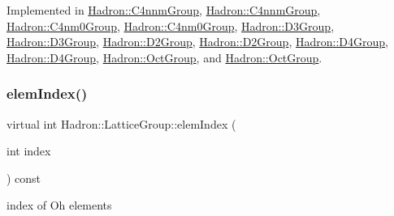 Implemented in \mbox{\hyperlink{structHadron_1_1C4nnmGroup_a8cbcb161ddf801e759797f231db35f75}{Hadron\+::\+C4nnm\+Group}}, \mbox{\hyperlink{structHadron_1_1C4nnmGroup_a8cbcb161ddf801e759797f231db35f75}{Hadron\+::\+C4nnm\+Group}}, \mbox{\hyperlink{structHadron_1_1C4nm0Group_a700a48f1865a634b774127d8710e1ecc}{Hadron\+::\+C4nm0\+Group}}, \mbox{\hyperlink{structHadron_1_1C4nm0Group_a700a48f1865a634b774127d8710e1ecc}{Hadron\+::\+C4nm0\+Group}}, \mbox{\hyperlink{structHadron_1_1D3Group_a90ac88df35dd8e919637917dc22ee903}{Hadron\+::\+D3\+Group}}, \mbox{\hyperlink{structHadron_1_1D3Group_a90ac88df35dd8e919637917dc22ee903}{Hadron\+::\+D3\+Group}}, \mbox{\hyperlink{structHadron_1_1D2Group_aa7676a51e002eb654648c4d84585d6da}{Hadron\+::\+D2\+Group}}, \mbox{\hyperlink{structHadron_1_1D2Group_aa7676a51e002eb654648c4d84585d6da}{Hadron\+::\+D2\+Group}}, \mbox{\hyperlink{structHadron_1_1D4Group_aa4ca8a3f1bc6774b630cd6a354179298}{Hadron\+::\+D4\+Group}}, \mbox{\hyperlink{structHadron_1_1D4Group_aa4ca8a3f1bc6774b630cd6a354179298}{Hadron\+::\+D4\+Group}}, \mbox{\hyperlink{structHadron_1_1OctGroup_a1410a74894e1d12337548245c4e6fd47}{Hadron\+::\+Oct\+Group}}, and \mbox{\hyperlink{structHadron_1_1OctGroup_a1410a74894e1d12337548245c4e6fd47}{Hadron\+::\+Oct\+Group}}.

\mbox{\label{structHadron_1_1LatticeGroup_afb8e3ee60de059f75bce1044c694e1e8}} 
\subsubsection{\texorpdfstring{elemIndex()}{elemIndex()}\hspace{0.1cm}{\footnotesize\ttfamily [2/2]}}
{\footnotesize\ttfamily virtual int Hadron\+::\+Lattice\+Group\+::elem\+Index (\begin{DoxyParamCaption}\item[{int}]{index }\end{DoxyParamCaption}) const\hspace{0.3cm}{\ttfamily [pure virtual]}}

index of Oh elements 

